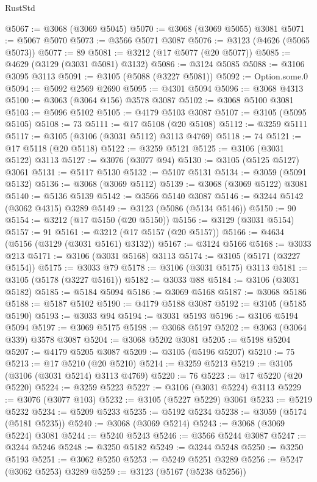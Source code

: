 \begin{lexlean}{RustStd}
\begin{coremodule}
@5067 := @3068 (@3069 @5045)
@5070 := @3068 (@3069 @5055) @3081
@5071 := @5067 @5070
@5073 := @3566 @5071 @3087
@5076 := @3123 (@4626 (@5065 @5073))
@5077 := 89
@5081 := @3212 (@17 @5077 (@20 @5077))
@5085 := @4629 (@3129 (@3031 @5081) @3132)
@5086 := @3124 @5085
@5088 := @3106 @3095 @3113
@5091 := @3105 (@5088 (@3227 @5081))
@5092 := Option.some.{0}
@5094 := @5092 @2569 @2690
@5095 := @4301 @5094
@5096 := @3068 @4313
@5100 := @3063 (@3064 @156) @3578 @3087
@5102 := @3068 @5100 @3081
@5103 := @5096 @5102
@5105 := @4179 @5103 @3087
@5107 := @3105 (@5095 @5105)
@5108 := 73
@5111 := @17 @5108 (@20 @5108)
@5112 := @3259 @5111
@5117 := @3105 (@3106 (@3031 @5112) @3113 @4769)
@5118 := 74
@5121 := @17 @5118 (@20 @5118)
@5122 := @3259 @5121
@5125 := @3106 (@3031 @5122) @3113
@5127 := @3076 (@3077 @94)
@5130 := @3105 (@5125 @5127) @3061
@5131 := @5117 @5130
@5132 := @5107 @5131
@5134 := @3059 (@5091 @5132)
@5136 := @3068 (@3069 @5112)
@5139 := @3068 (@3069 @5122) @3081
@5140 := @5136 @5139
@5142 := @3566 @5140 @3087
@5146 := @3244 @5142 (@3062 @4315) @3289
@5149 := @3123 (@5086 (@5134 @5146))
@5150 := 90
@5154 := @3212 (@17 @5150 (@20 @5150))
@5156 := @3129 (@3031 @5154)
@5157 := 91
@5161 := @3212 (@17 @5157 (@20 @5157))
@5166 := @4634 (@5156 (@3129 (@3031 @5161) @3132))
@5167 := @3124 @5166
@5168 := @3033 @213
@5171 := @3106 (@3031 @5168) @3113
@5174 := @3105 (@5171 (@3227 @5154))
@5175 := @3033 @79
@5178 := @3106 (@3031 @5175) @3113
@5181 := @3105 (@5178 (@3227 @5161))
@5182 := @3033 @88
@5184 := @3106 (@3031 @5182)
@5185 := @5184 @5094
@5186 := @3069 @5168
@5187 := @3068 @5186
@5188 := @5187 @5102
@5190 := @4179 @5188 @3087
@5192 := @3105 (@5185 @5190)
@5193 := @3033 @94
@5194 := @3031 @5193
@5196 := @3106 @5194 @5094
@5197 := @3069 @5175
@5198 := @3068 @5197
@5202 := @3063 (@3064 @339) @3578 @3087
@5204 := @3068 @5202 @3081
@5205 := @5198 @5204
@5207 := @4179 @5205 @3087
@5209 := @3105 (@5196 @5207)
@5210 := 75
@5213 := @17 @5210 (@20 @5210)
@5214 := @3259 @5213
@5219 := @3105 (@3106 (@3031 @5214) @3113 @4769)
@5220 := 76
@5223 := @17 @5220 (@20 @5220)
@5224 := @3259 @5223
@5227 := @3106 (@3031 @5224) @3113
@5229 := @3076 (@3077 @103)
@5232 := @3105 (@5227 @5229) @3061
@5233 := @5219 @5232
@5234 := @5209 @5233
@5235 := @5192 @5234
@5238 := @3059 (@5174 (@5181 @5235))
@5240 := @3068 (@3069 @5214)
@5243 := @3068 (@3069 @5224) @3081
@5244 := @5240 @5243
@5246 := @3566 @5244 @3087
@5247 := @3244 @5246
@5248 := @3250 @5182
@5249 := @3244 @5248
@5250 := @3250 @5193
@5251 := @3062 @5250
@5253 := @5249 @5251 @3289
@5256 := @5247 (@3062 @5253) @3289
@5259 := @3123 (@5167 (@5238 @5256))

\end{coremodule}
\end{lexlean}
